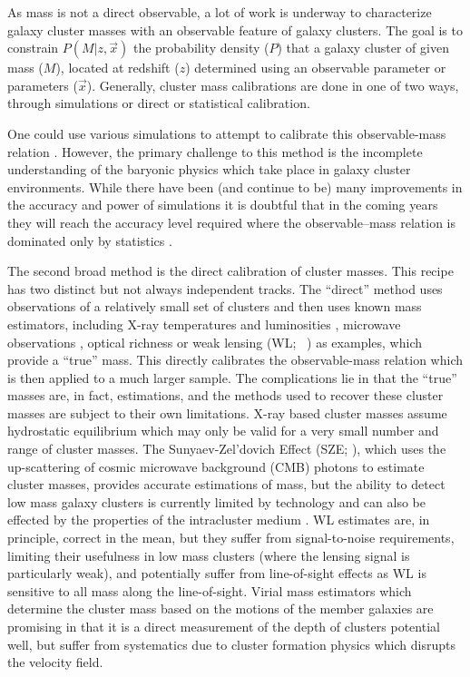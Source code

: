\documentclass[fleqn,usenatbib]{mnras}
\begin{document}
As mass is not a direct observable, a lot of work is underway to characterize galaxy cluster masses with an observable feature of galaxy clusters. The goal is to constrain $P(M|z, \vec{x})$ the probability density ($P$) that a galaxy cluster of given mass ($M$), located at redshift ($z$) determined using an observable parameter or parameters ($\vec{x}$). Generally, cluster mass calibrations are done in one of two ways, through simulations or direct or statistical calibration.

One could use various simulations to attempt to calibrate this observable-mass relation . However, the primary challenge to this method is the incomplete understanding of the baryonic physics which take place in galaxy cluster environments. While there have been (and continue to be) many improvements in the accuracy and power of simulations it is doubtful that in the coming years they will reach the accuracy level required where the observable--mass relation is dominated only by statistics \citep{Weinberg2013}. 
 
The second broad method is the direct calibration of cluster masses. This recipe has two distinct but not always independent tracks. The ``direct'' method uses observations of a relatively small set of clusters and then uses known mass estimators, including X-ray temperatures and luminosities , microwave observations , optical richness  or weak lensing (WL; \eg\ \citealt{Rozo2010}) as examples, which provide a ``true'' mass. This directly calibrates the observable-mass relation which is then applied to a much larger sample. The complications lie in that the ``true'' masses are, in fact, estimations, and the methods used to recover these cluster masses are subject to their own limitations. X-ray based cluster masses assume hydrostatic equilibrium  which may only be valid for a very small number and range of cluster masses. The Sunyaev-Zel'dovich Effect (SZE; \citealt{Sunyaev1972}), which uses the up-scattering of cosmic microwave background (CMB) photons to estimate cluster masses, provides accurate estimations of mass, but the ability to detect low mass galaxy clusters is currently limited by technology  and can also be effected by the properties of the intracluster medium . WL estimates are, in principle, correct in the mean, but they suffer from signal-to-noise requirements, limiting their usefulness in low mass clusters (where the lensing signal is particularly weak), and potentially suffer from line-of-sight effects as WL is sensitive to all mass along the line-of-sight. Virial mass estimators which determine the cluster mass based on the motions of the member galaxies  are promising in that it is a direct measurement of the depth of clusters potential well, but suffer from systematics due to cluster formation physics which disrupts the velocity field.
 
\end{document}
